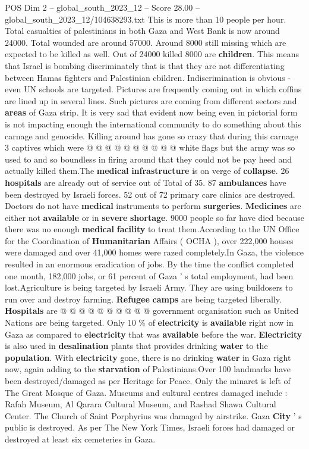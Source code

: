 \begin{textsample}{POS Dim 2 – global\_south\_2023\_12 – Score 28.00 – global\_south\_2023\_12/104638293.txt}
This is more than 10 people per hour.
Total casualties of palestinians in both Gaza and West Bank is now around 24000.
Total wounded are around 57000.
Around 8000 still missing which are expected to be killed as well.
Out of 24000 killed 8000 are \textbf{children}.
This means that Israel is bombing discriminately that is that they are not differentiating between Hamas fighters and Palestinian cbildren.
Indiscrimination is obvious - even UN schools are targeted.
Pictures are frequently coming out in which coffins are lined up in several lines.
Such pictures are coming from different sectors and \textbf{areas} of Gaza strip.
It is very sad that evident now being even in pictorial form is not impacting enough the international community to do something about this carnage and genocide.
Killing around has gone so crazy that during this carnage 3 captives which were @ @ @ @ @ @ @ @ @ @ white flags but the army was so used to and so boundless in firing around that they could not be pay heed and actually killed them.The \textbf{medical} \textbf{infrastructure} is on verge of \textbf{collapse}. 26 \textbf{hospitals} are already out of service out of Total of 35. 87 \textbf{ambulances} have been destroyed by Israeli forces. 52 out of 72 primary care clinics are destroyed.
Doctors do not have \textbf{medical} instruments to perform \textbf{surgeries}. \textbf{Medicines} are either not \textbf{available} or in \textbf{severe} \textbf{shortage}. 9000 people so far have died because there was no enough \textbf{medical} \textbf{facility} to treat them.According to the UN Office for the Coordination of \textbf{Humanitarian} Affairs ( OCHA ), over 222,000 houses were damaged and over 41,000 homes were razed completely.In Gaza, the violence resulted in an enormous eradication of jobs.
By the time the conflict completed one month, 182,000 jobs, or 61 percent of Gaza ' s total employment, had been lost.Agriculture is being targeted by Israeli Army.
They are using buildosers to run over and destroy farming. \textbf{Refugee} \textbf{camps} are being targeted liberally. \textbf{Hospitals} are @ @ @ @ @ @ @ @ @ @ government organisation such as United Nations are being targeted.
Only 10 \% of \textbf{electricity} is \textbf{available} right now in Gaza as compared to \textbf{electricity} that was \textbf{available} before the war. \textbf{Electricity} is also used in \textbf{desalination} plants that provides drinking \textbf{water} to the \textbf{population}.
With \textbf{electricity} gone, there is no drinking \textbf{water} in Gaza right now, again adding to the \textbf{starvation} of Palestinians.Over 100 landmarks have been destroyed/damaged as per Heritage for Peace.
Only the minaret is left of The Great Mosque of Gaza.
Museums and cultural centres damaged include : Rafah Museum, Al Qarara Cultural Museum, and Rashad Shawa Cultural Center.
The Church of Saint Porphyrius was damaged by airstrike.
Gaza \textbf{City} ' s public is destroyed.
As per The New York Times, Israeli forces had damaged or destroyed at least six cemeteries in Gaza.


\end{textsample}

